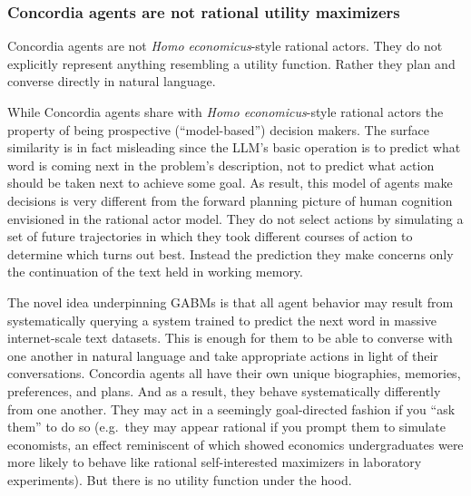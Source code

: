 \documentclass[11pt, a4paper, logo, twocolumn, internal, copyright, numbering]{googledeepmind}
\begin{document}
\subsubsection{Concordia agents are not rational utility maximizers}\label{section:notRational}

Concordia agents are not \textit{Homo economicus}-style rational actors. They do not explicitly represent anything resembling a utility function. Rather they plan and converse directly in natural language.

While Concordia agents share with \textit{Homo economicus}-style rational actors the property of being prospective (``model-based'') decision makers. The surface similarity is in fact misleading since the LLM's basic operation is to predict what word is coming next in the problem's description, not to predict what action should be taken next to achieve some goal. As result, this model of agents make decisions is very different from the forward planning picture of human cognition envisioned in the rational actor model. They do not select actions by simulating a set of future trajectories in which they took different courses of action to determine which turns out best. Instead the prediction they make concerns only the continuation of the text held in working memory.

The novel idea underpinning GABMs is that all agent behavior may result from systematically querying a system trained to predict the next word in massive internet-scale text datasets. This is enough for them to be able to converse with one another in natural language and take appropriate actions in light of their conversations. Concordia agents all have their own unique biographies, memories, preferences, and plans. And as a result, they behave systematically differently from one another. They may act in a seemingly goal-directed fashion if you ``ask them'' to do so (e.g.~they may appear rational if you prompt them to simulate economists, an effect reminiscent of \cite{carter1991economists, frank1993does} which showed economics undergraduates were more likely to behave like rational self-interested maximizers in laboratory experiments). But there is no utility function under the hood.
\end{document}
